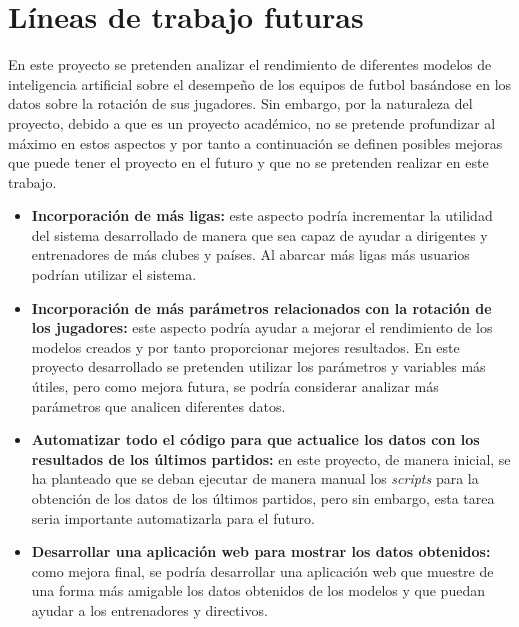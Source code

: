 \section{Líneas de trabajo futuras}


En este proyecto se pretenden analizar el rendimiento de diferentes modelos de inteligencia artificial sobre el desempeño de los equipos de futbol basándose en los datos sobre la rotación de sus jugadores. Sin embargo, por la naturaleza del proyecto, debido a que es un proyecto académico, no se pretende profundizar al máximo en estos aspectos y por tanto a continuación se definen posibles mejoras que puede tener el proyecto en el futuro y que no se pretenden realizar en este trabajo.
\begin{itemize}
    \item \textbf{Incorporación de más ligas: } este aspecto podría incrementar la utilidad del sistema desarrollado de manera que sea capaz de ayudar a dirigentes y entrenadores de más clubes y países. Al abarcar más ligas más usuarios podrían utilizar el sistema.
    \item \textbf{Incorporación de más parámetros relacionados con la rotación de los jugadores:} este aspecto podría ayudar a mejorar el rendimiento de los modelos creados y por tanto proporcionar mejores resultados. En este proyecto desarrollado se pretenden utilizar los parámetros y variables más útiles, pero como mejora futura, se podría considerar analizar más parámetros que analicen diferentes datos.
    \item \textbf{Automatizar todo el código para que actualice los datos con los resultados de los últimos partidos:} en este proyecto, de manera inicial, se ha planteado que se deban ejecutar de manera manual los \textit{scripts} para la obtención de los datos de los últimos partidos, pero sin embargo, esta tarea seria importante automatizarla para el futuro.
    \item \textbf{Desarrollar una aplicación web para mostrar los datos obtenidos:} como mejora final, se podría desarrollar una aplicación web que muestre de una forma más amigable los datos obtenidos de los modelos y que puedan ayudar a los entrenadores y directivos. 
\end{itemize}

